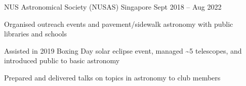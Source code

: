 \begin{cventries}
	{NUS Astronomical Society (NUSAS)} %
	{Singapore} %
	{Sept 2018 -- Aug 2022} %
	{
		\begin{cvitems} %
			\item Organised outreach events and pavement/sidewalk astronomy with public libraries and schools
			\item Assisted in 2019 Boxing Day solar eclipse event, managed \textasciitilde5 telescopes, and introduced public to basic astronomy
			\item Prepared and delivered talks on topics in astronomy to club members
		\end{cvitems}
	}

\end{cventries}
